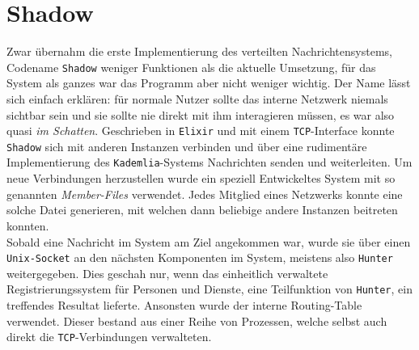 \documentclass[11pt]{report}
\begin{document}
\section{Shadow}
\label{sec:org8e22014}
Zwar übernahm die erste Implementierung des verteilten
Nachrichtensystems, Codename \texttt{Shadow} weniger Funktionen als die
aktuelle Umsetzung, für das System als ganzes war das Programm aber
nicht weniger wichtig. Der Name lässt sich einfach erklären: für
normale Nutzer sollte das interne Netzwerk niemals sichtbar sein und
sie sollte nie direkt mit ihm interagieren müssen, es war also quasi
\emph{im Schatten}. Geschrieben in \texttt{Elixir} und mit einem \texttt{TCP}-Interface konnte
\texttt{Shadow} sich mit anderen Instanzen verbinden und über eine rudimentäre
Implementierung des \texttt{Kademlia}-Systems Nachrichten senden und
weiterleiten. Um neue Verbindungen herzustellen wurde ein speziell
Entwickeltes System mit so genannten \emph{Member-Files} verwendet. Jedes
Mitglied eines Netzwerks konnte eine solche Datei generieren, mit
welchen dann beliebige andere Instanzen beitreten konnten.\\

\noindent Sobald eine Nachricht im System am Ziel angekommen war,
wurde sie über einen \texttt{Unix-Socket} an den nächsten Komponenten im
System, meistens also \texttt{Hunter} weitergegeben. Dies geschah nur, wenn das
einheitlich verwaltete Registrierungssystem für Personen und Dienste,
eine Teilfunktion von \texttt{Hunter}, ein treffendes Resultat lieferte.
Ansonsten wurde der interne Routing-Table verwendet. Dieser bestand
aus einer Reihe von Prozessen, welche selbst auch direkt die
\texttt{TCP}-Verbindungen verwalteten. 
\end{document}
